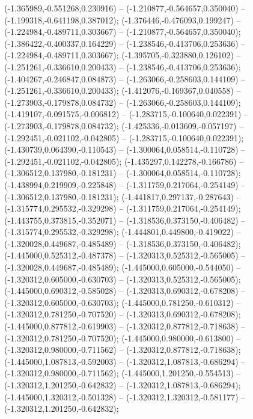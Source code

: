  (-1.365989,-0.551268,0.230916) -- (-1.210877,-0.564657,0.350040) -- (-1.199318,-0.641198,0.387012);
 (-1.376446,-0.476093,0.199247) -- (-1.224984,-0.489711,0.303667) -- (-1.210877,-0.564657,0.350040);
 (-1.386422,-0.400337,0.164229) -- (-1.238546,-0.413706,0.253636) -- (-1.224984,-0.489711,0.303667);
 (-1.395705,-0.323880,0.126102) -- (-1.251261,-0.336610,0.200433) -- (-1.238546,-0.413706,0.253636);
 (-1.404267,-0.246847,0.084873) -- (-1.263066,-0.258603,0.144109) -- (-1.251261,-0.336610,0.200433);
 (-1.412076,-0.169367,0.040558) -- (-1.273903,-0.179878,0.084732) -- (-1.263066,-0.258603,0.144109);
 (-1.419107,-0.091575,-0.006812) -- (-1.283715,-0.100640,0.022391) -- (-1.273903,-0.179878,0.084732);
 (-1.425336,-0.013609,-0.057197) -- (-1.292451,-0.021102,-0.042805) -- (-1.283715,-0.100640,0.022391);
 (-1.430739,0.064390,-0.110543) -- (-1.300064,0.058514,-0.110728) -- (-1.292451,-0.021102,-0.042805);
 (-1.435297,0.142278,-0.166786) -- (-1.306512,0.137980,-0.181231) -- (-1.300064,0.058514,-0.110728);
 (-1.438994,0.219909,-0.225848) -- (-1.311759,0.217064,-0.254149) -- (-1.306512,0.137980,-0.181231);
 (-1.441817,0.297137,-0.287643) -- (-1.315774,0.295532,-0.329298) -- (-1.311759,0.217064,-0.254149);
 (-1.443755,0.373815,-0.352071) -- (-1.318536,0.373150,-0.406482) -- (-1.315774,0.295532,-0.329298);
 (-1.444801,0.449800,-0.419022) -- (-1.320028,0.449687,-0.485489) -- (-1.318536,0.373150,-0.406482);
 (-1.445000,0.525312,-0.487378) -- (-1.320313,0.525312,-0.565005) -- (-1.320028,0.449687,-0.485489);
 (-1.445000,0.605000,-0.544050) -- (-1.320312,0.605000,-0.630703) -- (-1.320313,0.525312,-0.565005);
 (-1.445000,0.690312,-0.585028) -- (-1.320313,0.690312,-0.678208) -- (-1.320312,0.605000,-0.630703);
 (-1.445000,0.781250,-0.610312) -- (-1.320312,0.781250,-0.707520) -- (-1.320313,0.690312,-0.678208);
 (-1.445000,0.877812,-0.619903) -- (-1.320312,0.877812,-0.718638) -- (-1.320312,0.781250,-0.707520);
 (-1.445000,0.980000,-0.613800) -- (-1.320312,0.980000,-0.711562) -- (-1.320312,0.877812,-0.718638);
 (-1.445000,1.087813,-0.592003) -- (-1.320312,1.087813,-0.686294) -- (-1.320312,0.980000,-0.711562);
 (-1.445000,1.201250,-0.554513) -- (-1.320312,1.201250,-0.642832) -- (-1.320312,1.087813,-0.686294);
 (-1.445000,1.320312,-0.501328) -- (-1.320312,1.320312,-0.581177) -- (-1.320312,1.201250,-0.642832);
